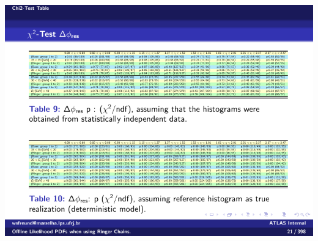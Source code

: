 \begin{table}[b]
\begin{subtable}{\textwidth}
\end{subtable} \\
\begin{subtable}{\textwidth}
\caption{\deltaphires{}\label{tab:p_values_deltaphi}}
\includegraphics[width=\textwidth]{appendices/figures/homogeneity/deltaphi_homogeneity_table}
\end{subtable} \\
\end{table}
